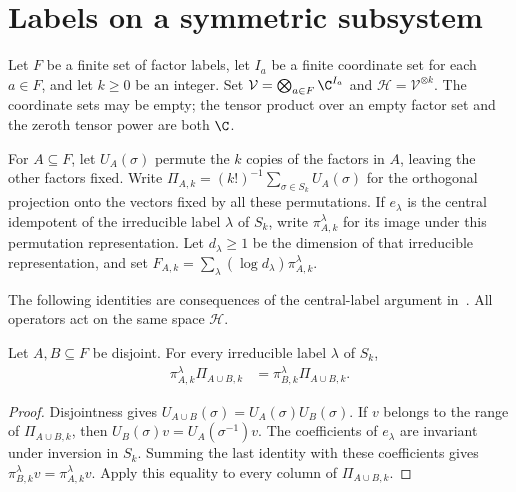 \section{Labels on a symmetric subsystem}
\label{sec:symmetric_subsystem_labels}

Let $F$ be a finite set of factor labels, let $I_a$ be a finite coordinate
set for each $a\in F$, and let $k\geq 0$ be an integer. Set
$\mathcal V=\bigotimes_{a\in F}\C^{I_a}$ and
$\mathcal H=\mathcal V^{\otimes k}$. The coordinate sets may be empty;
the tensor product over an empty factor set and the zeroth tensor power
are both $\C$.

For $A\subseteq F$, let $U_A(\sigma)$ permute the $k$ copies of the
factors in $A$, leaving the other factors fixed. Write
$\Pi_{A,k}=(k!)^{-1}\sum_{\sigma\in S_k}U_A(\sigma)$ for the orthogonal
projection onto the vectors fixed by all these permutations. If $e_\lambda$
is the central idempotent of the irreducible label $\lambda$ of $S_k$,
write $\pi^\lambda_{A,k}$ for its image under this permutation
representation. Let $d_\lambda\geq 1$ be the dimension of that irreducible
representation, and set
$F_{A,k}=\sum_\lambda(\log d_\lambda)\pi^\lambda_{A,k}$.

The following identities are consequences of the central-label argument
in~\cite[Lemma~6.1(2)]{OpenAI2026AreaLaw}. All operators act on the same
space $\mathcal H$.

\begin{theorem}
    \label{thm:symmetric_union_label_projectors}
    \leanok
    Let $A,B\subseteq F$ be disjoint. For every irreducible label
    $\lambda$ of $S_k$,
    \begin{align}
        \pi^\lambda_{A,k}\Pi_{A\cup B,k}
         & =\pi^\lambda_{B,k}\Pi_{A\cup B,k}.
        \label{eq:symmetric_union_projectors}
    \end{align}
\end{theorem}

\begin{proof}\leanok
    Disjointness gives
    $U_{A\cup B}(\sigma)=U_A(\sigma)U_B(\sigma)$.
    If $v$ belongs to the range of $\Pi_{A\cup B,k}$, then
    $U_B(\sigma)v=U_A(\sigma^{-1})v$.
    The coefficients of $e_\lambda$ are invariant under inversion in
    $S_k$. Summing the last identity with these coefficients gives
    $\pi^\lambda_{B,k}v=\pi^\lambda_{A,k}v$.
    Apply this equality to every column of $\Pi_{A\cup B,k}$.
\end{proof}

